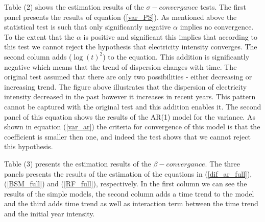 \documentclass[]{amsart}
\begin{document}
Table (2) shows the estimation results of the $\sigma-convergance$ tests. The first panel presents the results of equation (\ref{var_PS}). As mentioned above the statistical test is such that only significantly negative $\alpha$ implies no convergence. To the extent that the $\alpha$ is positive and significant this implies that according to this test we cannot reject the hypothesis that electricity intensity converges. The second column adds ($\log(t)^2$) to the equation. This addition is significantly negative which means that the trend of dispersion changes with time. The original test assumed that there are only two possibilities - either decreasing or increasing trend. The figure above illustrates that the dispersion of electricity intensity decreased in the past however it increases in recent years. This pattern cannot be captured with the original test and this addition enables it. The second panel of this equation shows the results of the AR(1) model for the variance. As shown in equation (\ref{var_ar}) the criteria for convergence of this model is that the coefficient is smaller then one, and indeed the test shows that we cannot reject this hypothesis.

\bigskip

Table (3) presents the estimation results of the $\beta-convergance$. The three panels presents the results of the estimation of the equations in (\ref{dif_ar_full}), (\ref{BSM_full}) and (\ref{RF_full}), respectively. In the first column we can see the results of the simple models, the second column adds a time trend to the model and the third adds time trend as well as interaction term between the time trend and the initial year intensity. 

\bigskip
\end{document}
